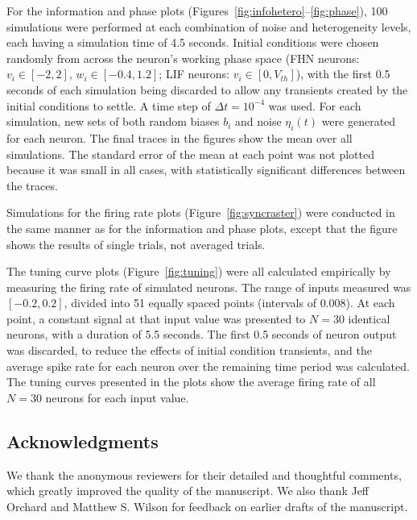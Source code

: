 \documentclass[12pt]{article}
\begin{document}
For the information and phase plots (Figures~\ref{fig:infohetero}--\ref{fig:phase}), 100 simulations were performed at each combination of noise and heterogeneity levels, each having a simulation time of 4.5 seconds. Initial conditions were chosen randomly from across the neuron's working phase space (FHN neurons: $v_i \in [-2, 2]$, $w_i \in [-0.4, 1.2]$; LIF neurons: $v_i \in [0, V_{th}]$), with the first 0.5 seconds of each simulation being discarded to allow any transients created by the initial conditions to settle. A time step of $\Delta t = 10^{-4}$ was used. For each simulation, new sets of both random biases $b_i$ and noise $\eta_i(t)$ were generated for each neuron. The final traces in the figures show the mean over all simulations. The standard error of the mean at each point was not plotted because it was small in all cases, with statistically significant differences between the traces.

Simulations for the firing rate plots (Figure~\ref{fig:syncraster}) were conducted in the same manner as for the information and phase plots, except that the figure shows the results of single trials, not averaged trials.

The tuning curve plots (Figure~\ref{fig:tuning}) were all calculated empirically by measuring the firing rate of simulated neurons. The range of inputs measured was $[-0.2, 0.2]$, divided into 51 equally spaced points (intervals of $0.008$). At each point, a constant signal at that input value was presented to $N = 30$ identical neurons, with a duration of 5.5 seconds. The first 0.5 seconds of neuron output was discarded, to reduce the effects of initial condition transients, and the average spike rate for each neuron over the remaining time period was calculated.
The tuning curves presented in the plots show the average firing rate of all $N = 30$ neurons for each input value.

\subsection*{Acknowledgments}

We thank the anonymous reviewers for their detailed and thoughtful comments, which greatly improved the quality of the manuscript.
We also thank Jeff Orchard and Matthew S. Wilson for feedback on earlier drafts of the manuscript.
\end{document}
